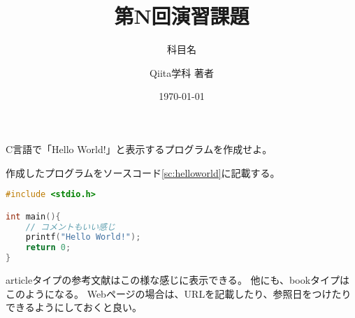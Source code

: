 \documentclass[uplatex,dvipdfmx,11pt,a4paper]{jsarticle} %
\title{第N回演習課題}
\subtitle{科目名}
\author{Qiita学科 著者}
\institute{学籍番号:12345678}
\date{\today}
\begin{document}
\maketitle

\begin{problem}
    C言語で「Hello World!」と表示するプログラムを作成せよ。
\end{problem}

作成したプログラムをソースコード\ref{sc:helloworld}に記載する。

% 

\begin{lstlisting}[language=c, caption=Hello Worldを表示するプログラム, label=sc:helloworld]
#include <stdio.h>

int main(){
    // コメントもいい感じ
    printf("Hello World!");
    return 0;
}
\end{lstlisting}

articleタイプの参考文献はこの様な感じに表示できる\cite{jpArticle3,enArticle3}。
他にも、bookタイプはこのようになる\cite{jpBook1}。
Webページの場合は、URLを記載したり、参照日をつけたりできるようにしておくと良い\cite{example}。


\end{document}
